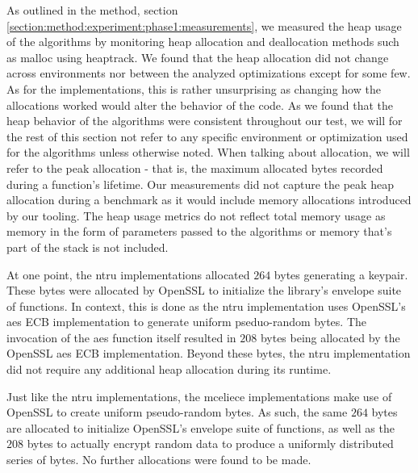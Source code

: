 As outlined in the method, section \ref{section:method:experiment:phase1:measurements}, we measured the heap usage of the algorithms by monitoring heap allocation and deallocation methods such as malloc using heaptrack. We found that the heap allocation did not change across environments nor between the analyzed optimizations except for some few. As for the implementations, this is rather unsurprising as changing how the allocations worked would alter the behavior of the code. As we found that the heap behavior of the algorithms were consistent throughout our test, we will for the rest of this section not refer to any specific environment or optimization used for the algorithms unless otherwise noted. When talking about allocation, we will refer to the peak allocation - that is, the maximum allocated bytes recorded during a function's lifetime. Our measurements did not capture the peak heap allocation during a benchmark as it would include memory allocations introduced by our tooling. The heap usage metrics do not reflect total memory usage as memory in the form of parameters passed to the algorithms or memory that's part of the stack is not included.

At one point, the \gls{ntru} implementations allocated $264$ bytes generating a keypair. These bytes were allocated by OpenSSL to initialize the library's envelope suite of functions. In context, this is done as the \gls{ntru} implementation uses OpenSSL's \gls{aes} ECB implementation to generate uniform pseduo-random bytes. The invocation of the \gls{aes} function itself resulted in $208$ bytes being allocated by the OpenSSL \gls{aes} ECB implementation. Beyond these bytes, the \gls{ntru} implementation did not require any additional heap allocation during its runtime.

Just like the \gls{ntru} implementations, the \gls{mceliece} implementations make use of OpenSSL to create uniform pseudo-random bytes. As such, the same $264$ bytes are allocated to initialize OpenSSL's envelope suite of functions, as well as the $208$ bytes to actually encrypt random data to produce a uniformly distributed series of bytes. No further allocations were found to be made.

